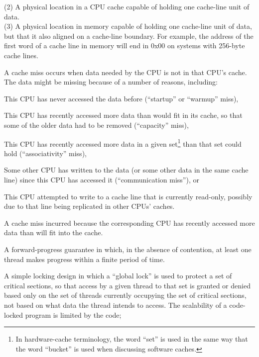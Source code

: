 \begin{description}
	(2) A physical location in a CPU cache capable of holding
	one cache-line unit of data. \\
	(3) A physical location in memory capable of holding one
	cache-line unit of data, but that it also aligned
	on a cache-line boundary.
	For example, the address of the first word of a cache line
	in memory will end in 0x00 on systems with 256-byte cache lines.
\item[\IX{Cache Miss}:]
	A cache miss occurs when data needed by the CPU is not in
	that CPU's cache.
	The data might be missing because of a number of reasons,
	including:
	\begin{enumerate*}[(1)]
	\item This CPU has never accessed the data before
	(``startup'' or ``warmup'' miss),
	\item This CPU has recently accessed more
	data than would fit in its cache, so that some of the older
	data had to be removed (``capacity'' miss),
	\item This CPU
	has recently accessed more data in a given set\footnote{
		In hardware-cache terminology, the word ``set''
		is used in the same way that the word ``bucket''
		is used when discussing software caches.}
	than that set could hold (``associativity'' miss),
	\item Some other CPU has written to the data (or some other
	data in the same cache line) since this CPU has accessed it
	(``communication miss''), or
	\item This CPU attempted to write to a cache line that is
	currently read-only, possibly due to that line being replicated
	in other CPUs' caches.
	\end{enumerate*}
\item[\IXalth{Capacity Miss}{capacity}{cache miss}:]
	A cache miss incurred because the corresponding CPU has recently
	accessed more data than will fit into the cache.
\item[\IX{Clash Free}:]
	A forward-progress guarantee in which, in the absence of
	contention, at least one thread makes progress within a finite
	period of time.
\item[\IXalth{Code Locking}{code}{locking}:]
	A simple locking design in which a ``global lock'' is used to protect
	a set of critical sections, so that access by a given thread
	to that set is
	granted or denied based only on the set of threads currently
	occupying the set of critical sections, not based on what
	data the thread intends to access.
	The scalability of a code-locked program is limited by the code;

\end{description}
